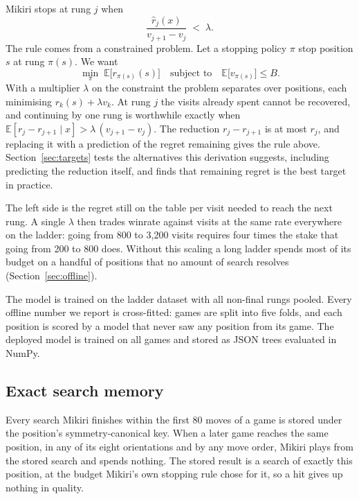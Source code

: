 Mikiri stops at rung $j$ when
\begin{equation}
  \frac{\hat r_j(x)}{v_{j+1}-v_j} \;<\; \lambda .
\end{equation}
The rule comes from a constrained problem. Let a stopping policy $\pi$ stop position $s$ at rung $\pi(s)$. We want
\begin{equation}
  \min_\pi \; \mathbb{E}\bigl[r_{\pi(s)}(s)\bigr] \quad \text{subject to} \quad \mathbb{E}\bigl[v_{\pi(s)}\bigr] \le B .
\end{equation}
With a multiplier $\lambda$ on the constraint the problem separates over positions, each minimising $r_k(s)+\lambda v_k$. At rung $j$ the visits already spent cannot be recovered, and continuing by one rung is worthwhile exactly when $\mathbb{E}[r_j-r_{j+1}\mid x] > \lambda\,(v_{j+1}-v_j)$. The reduction $r_j-r_{j+1}$ is at most $r_j$, and replacing it with a prediction of the regret remaining gives the rule above. Section~\ref{sec:targets} tests the alternatives this derivation suggests, including predicting the reduction itself, and finds that remaining regret is the best target in practice.

The left side is the regret still on the table per visit needed to reach the next rung. A single $\lambda$ then trades winrate against visits at the same rate everywhere on the ladder: going from 800 to 3{,}200 visits requires four times the stake that going from 200 to 800 does. Without this scaling a long ladder spends most of its budget on a handful of positions that no amount of search resolves (Section~\ref{sec:offline}).

The model is trained on the ladder dataset with all non-final rungs pooled. Every offline number we report is cross-fitted: games are split into five folds, and each position is scored by a model that never saw any position from its game. The deployed model is trained on all games and stored as JSON trees evaluated in NumPy.

\subsection{Exact search memory}

Every search Mikiri finishes within the first 80 moves of a game is stored under the position's symmetry-canonical key. When a later game reaches the same position, in any of its eight orientations and by any move order, Mikiri plays from the stored search and spends nothing. The stored result is a search of exactly this position, at the budget Mikiri's own stopping rule chose for it, so a hit gives up nothing in quality.

